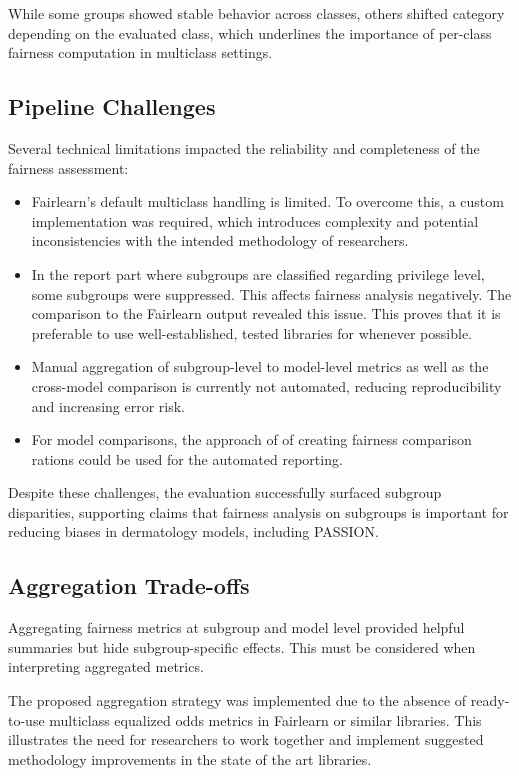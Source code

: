 \documentclass[12pt, a4paper, oneside]{book}   	%
\begin{document}
		While some groups showed stable behavior across classes, others shifted category depending on the evaluated class, which underlines the importance of per-class fairness computation in multiclass settings.	
		
		
		\subsection{Pipeline Challenges}
		
		Several technical limitations impacted the reliability and completeness of the fairness assessment:
		\begin{itemize}
			\item \gls{Fairlearn}’s default multiclass handling is limited. To overcome this, a custom implementation was required, which introduces complexity and potential inconsistencies with the intended methodology of researchers.
			\item In the report part where subgroups are classified regarding privilege level, some subgroups were suppressed. This affects fairness analysis negatively. The comparison to the \gls{Fairlearn} output revealed this issue. This proves that it is preferable to use well-established, tested libraries for whenever possible.
			\item Manual aggregation of subgroup-level to model-level metrics as well as the cross-model comparison is currently not automated, reducing reproducibility and increasing error risk.
			\item For model comparisons, the approach of \textcite{Valentim_2019} of creating fairness comparison rations could be used for the automated reporting.
		\end{itemize}
		
		Despite these challenges, the evaluation successfully surfaced subgroup disparities, supporting claims that fairness analysis on subgroups is important for reducing biases in dermatology models, including PASSION.
		
		\subsection{Aggregation Trade-offs}
		Aggregating fairness metrics at subgroup and model level provided helpful summaries but hide subgroup-specific effects. This must be considered when interpreting aggregated metrics.
		
		The proposed aggregation strategy was implemented due to the absence of ready-to-use multiclass equalized odds metrics in \gls{Fairlearn} or similar libraries. This illustrates the need for researchers to work together and implement suggested methodology improvements in the state of the art libraries.
		
\end{document}

